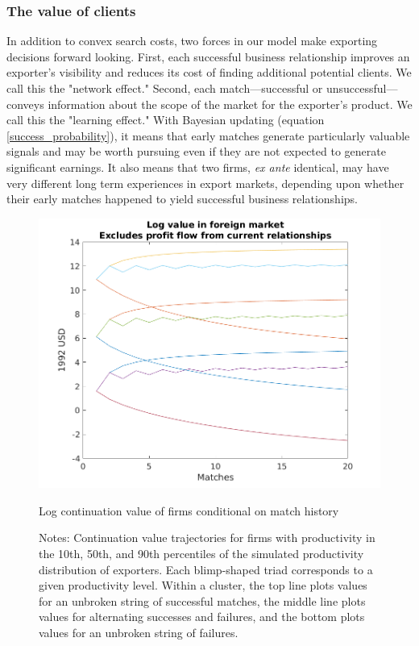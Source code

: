 \documentclass[12pt]{article}
\begin{document}
\subsubsection{The value of clients}

In addition to convex search costs, two forces in our model make exporting
decisions forward looking. First, each successful business relationship
improves an exporter's visibility and reduces its cost of finding additional
potential clients. We call this the "network effect." Second, each
match---successful or unsuccessful---conveys information about the scope of
the market for the exporter's product. We call this the "learning effect."
With Bayesian updating (equation \ref{success_probability}), it means that
early matches generate particularly valuable signals and may be worth
pursuing even if they are not expected to generate significant earnings. It
also means that two firms, \textit{ex ante} identical, may have very
different long term experiences in export markets, depending upon whether
their early matches happened to yield successful business relationships.

\begin{figure}
    \centering
    \includegraphics[scale=0.5]{figures/val_f_three_types}
    \caption{Log continuation value of firms conditional on match history}
    \label{fig:val_three_types}
    \caption*{Notes: Continuation value trajectories for firms with productivity in the 10th, 50th, and 90th percentiles of the simulated productivity distribution of exporters. Each blimp-shaped triad corresponds to a given productivity level. Within a cluster, the top line plots values for an unbroken string of successful matches, the middle line plots values for alternating successes and failures, and the bottom plots values for an unbroken string of failures.}
\end{figure} 
\end{document}
